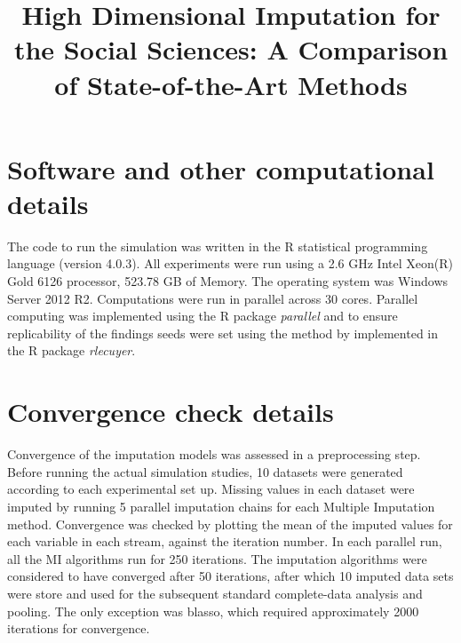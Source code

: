 \documentclass[]{./cls/interact}
\theoremstyle{plain}
\theoremstyle{definition}
\theoremstyle{remark}
\begin{document}

\title{High Dimensional Imputation for the Social Sciences: A Comparison of State-of-the-Art Methods}
\maketitle
\author{
}

\section{Software and other computational details}

The code to run the simulation was written in the R statistical programming language (version 4.0.3). 
All experiments were run using a 2.6 GHz Intel Xeon(R) Gold 6126 processor, 523.78 GB of Memory. The
operating system was Windows Server 2012 R2.
Computations were run in parallel across 30 cores. 
Parallel computing was implemented using the R package \emph{parallel} and to ensure replicability 
of the findings seeds were set using the method by \cite{lecuyer:2002} implemented in the R package 
\emph{rlecuyer}.

\section{Convergence check details}

	Convergence of the imputation models was assessed in a preprocessing step.
	Before running the actual simulation studies, 10 datasets were generated according to each experimental set up.
	Missing values in each dataset were imputed by running 5 parallel imputation chains for each Multiple Imputation 
	method.
	Convergence was checked by plotting the mean of the imputed values for each variable in each stream, against the 
	iteration number.
	In each parallel run, all the MI algorithms run for 250 iterations.
	The imputation algorithms were considered to have converged after 50 iterations, after which 10 imputed data 
	sets were store and used for the subsequent standard complete-data analysis and pooling.
	The only exception was blasso, which required approximately 2000 iterations for convergence.
\end{document}
